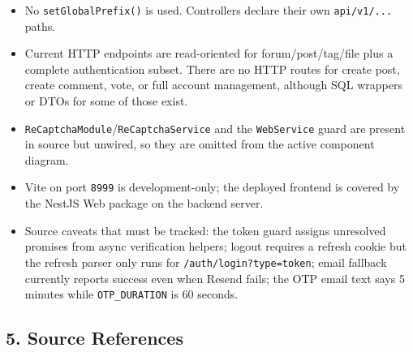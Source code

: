 \documentclass[12pt]{article}
\begin{document}
\begin{itemize}
\item No \texttt{setGlobalPrefix()} is used. Controllers declare their own \texttt{api/v1/...} paths.
\item Current HTTP endpoints are read-oriented for forum/post/tag/file plus a complete authentication subset. There are no HTTP routes for create post, create comment, vote, or full account management, although SQL wrappers or DTOs for some of those exist.
\item \texttt{ReCaptchaModule}/\texttt{ReCaptchaService} and the \texttt{WebService} guard are present in source but unwired, so they are omitted from the active component diagram.
\item Vite on port \texttt{8999} is development-only; the deployed frontend is covered by the NestJS Web package on the backend server.
\item Source caveats that must be tracked: the token guard assigns unresolved promises from async verification helpers; logout requires a refresh cookie but the refresh parser only runs for \texttt{/auth/login?type=token}; email fallback currently reports success even when Resend fails; the OTP email text says 5 minutes while \texttt{OTP\_DURATION} is 60 seconds.
\end{itemize}
\par\medskip

\hypertarget{sec:5-source-references}{}
\subsection*{5. Source References}
\par\medskip
\end{document}
